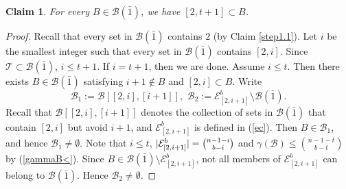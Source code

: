 \documentclass[11pt]{article}
\newcommand{\m}{\mathcal}
\newtheorem{claim}[theorem]{Claim}
\begin{document}
\begin{claim}\label{11-10-2}
For every $B\in \mathcal{B}(\bar{1})$, we have $[2, t+1]\subset B$.
\end{claim}

\begin{proof}

Recall that every set in $\m B(\bar1)$ contains $2$ (by Claim \ref{step1.1}).
Let $i$ be the smallest integer such that every set in $\m B(\bar1)$ contains $[2,i]$. 
Since $\m T \subset \m B(\bar1)$, $i\le t+1$.
If $i= t+1$, then we are done. Assume $i\le t$.
Then there exists $B\in \m B(\bar1)$ satisfying $i+1\not\in B$ and $[2,i]\subset B$.
Write 
\begin{equation*}
\m B_1:=\m B[[2,i],[i+1]], \, \,\m B_2:=\mathcal{E}^b_{[2,i+1]} \setminus \mathcal{B}(\bar{1}).
\end{equation*}
Recall that $\mathcal{B}[[2,i],[i+1]]$ denotes the collection of sets in $\mathcal{B}(\bar{1})$ that contain $[2,i]$ but avoid $i+1$, and $\mathcal{E}^b_{[2,i+1]}$ is defined in (\ref{ec}).
Then $B \in \mathcal{B}_1$, and hence $\mathcal{B}_1 \neq \emptyset$.
Note that $i\le t$, $|\m E^b_{[2,i+1]}|=\tbinom{n-1-i}{b-i}$ and $\gamma(\mathcal{B})\le {n-1-t \choose b-t}$ by (\ref{gammaB<}). 
Since $B\in\mathcal B(\bar1)\setminus \mathcal E^b_{[2,i+1]}$,
not all members of $\mathcal E^b_{[2,i+1]}$ can belong to
$\mathcal B(\bar1)$.
Hence $\mathcal B_2\neq\emptyset$.

\end{proof}
\end{document}
